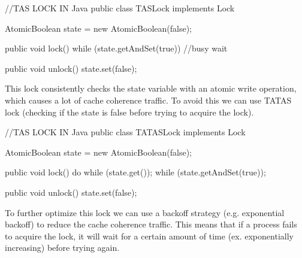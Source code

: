 \begin{codeexample}
//TAS LOCK IN Java
public class TASLock implements Lock {
    AtomicBoolean state = new AtomicBoolean(false);

    public void lock() {
        while (state.getAndSet(true)) {
            //busy wait
        }
    }

    public void unlock() {
        state.set(false);
    }
}
\end{codeexample}

\begin{remark}
    This lock consistently checks the state variable with an atomic write operation, which causes a lot of cache coherence traffic. To avoid this we can use TATAS lock (checking if the state is false before trying to acquire the lock).
\end{remark}

\begin{codeexample}
//TAS LOCK IN Java
public class TATASLock implements Lock {
    AtomicBoolean state = new AtomicBoolean(false);

    public void lock() {
        do {
            while (state.get());
        } while (state.getAndSet(true));
    }

    public void unlock() {
        state.set(false);
    }
}
\end{codeexample}

\begin{remark}
    To further optimize this lock we can use a backoff strategy (e.g. exponential backoff) to reduce the cache coherence traffic. This means that if a process fails to acquire the lock, it will wait for a certain amount of time (ex. exponentially increasing) before trying again.
\end{remark}

